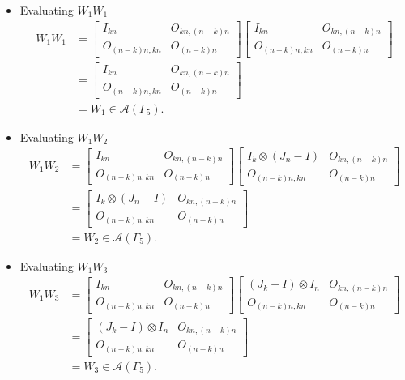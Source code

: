 \begin{itemize}
\item Evaluating $W_{1}W_{1}$
\begin{align*}
    W_1W_1 &= \begin{bmatrix}
    I_{kn} & O_{kn, (n-k)n} \\
    O_{(n-k)n,kn} & O_{(n-k)n}
    \end{bmatrix}
    \begin{bmatrix}
    I_{kn} & O_{kn, (n-k)n} \\
    O_{(n-k)n,kn} & O_{(n-k)n}
    \end{bmatrix}\\
    &= \begin{bmatrix}
    I_{kn} & O_{kn, (n-k)n} \\
    O_{(n-k)n,kn} & O_{(n-k)n}
    \end{bmatrix}\\
    &= W_1\in\mathcal{A}(\Gamma_5).
\end{align*}

\item Evaluating $W_{1}W_{2}$
\begin{align*}
W_1W_2 &=
\begin{bmatrix}
I_{kn} & O_{kn, (n-k)n} \\
O_{(n-k)n,kn} & O_{(n-k)n}
\end{bmatrix}
\begin{bmatrix}
I_k \otimes (J_n - I) & O_{kn, (n-k)n} \\
O_{(n-k)n,kn} & O_{(n-k)n}
\end{bmatrix}\\
&= \begin{bmatrix}
I_k \otimes (J_n - I) & O_{kn, (n-k)n} \\
O_{(n-k)n,kn} & O_{(n-k)n}
\end{bmatrix}\\
&= W_2\in\mathcal{A}(\Gamma_5).
\end{align*}

\item Evaluating $W_{1}W_{3}$
\begin{align*}
W_1W_3 &=
\begin{bmatrix}
I_{kn} & O_{kn, (n-k)n} \\
O_{(n-k)n,kn} & O_{(n-k)n}
\end{bmatrix}
\begin{bmatrix}
(J_k - I) \otimes I_n & O_{kn, (n-k)n} \\
O_{(n-k)n,kn} & O_{(n-k)n}
\end{bmatrix}\\
&= \begin{bmatrix}
(J_k - I) \otimes I_n & O_{kn, (n-k)n} \\
O_{(n-k)n,kn} & O_{(n-k)n}
\end{bmatrix}\\
&= W_3\in\mathcal{A}(\Gamma_5).
\end{align*}


\end{itemize}
